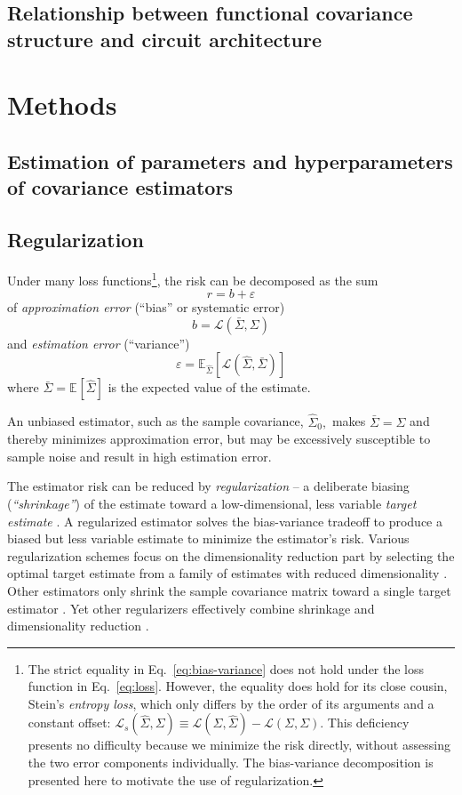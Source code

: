 \documentclass[10pt]{article}
\newcommand{\loss}[1]{\mathcal L\left(#1\right)}
\newcommand{\E}[2][]{\mathbb E_{#1}\left[ #2\right]}    %
\begin{document}
\subsection*{Relationship between functional covariance structure and circuit architecture}

\section*{Methods}
\subsection*{Estimation of parameters and hyperparameters of covariance estimators}
 
\subsection*{Regularization}
Under many loss functions\footnote{
The strict equality in Eq.~\ref{eq:bias-variance} does not hold under the loss function in Eq.~\ref{eq:loss}. 
However, the equality does hold for its close cousin, Stein's \emph{entropy loss}, which only differs by the order of its arguments and a constant offset: $\mathcal L_s(\hat\Sigma,\Sigma) \equiv \loss{\Sigma,\hat\Sigma} - \loss{\Sigma,\Sigma}$. 
This deficiency presents no difficulty because we minimize the risk directly, without assessing the two error components individually. 
The bias-variance decomposition is presented here to motivate the use of regularization.}, 
the risk can be decomposed as the sum
\begin{equation}\label{eq:bias-variance}
    r = b + \varepsilon
\end{equation}
of \emph{approximation error} (``bias'' or systematic error)
\begin{equation}
   b = \loss{\bar\Sigma,\Sigma}
\end{equation}
and \emph{estimation error} (``variance'') 
\begin{equation}
   \varepsilon = \E[\hat\Sigma]{\loss{\hat\Sigma, \bar\Sigma}}
\end{equation}
where $\bar\Sigma = \E{\hat\Sigma}$ is the expected value of the estimate. 

An unbiased estimator, such as the sample covariance,  $\hat\Sigma_0,$ makes $\bar\Sigma=\Sigma$ and thereby minimizes approximation error, but may be excessively susceptible to sample noise and result in high estimation error.

The estimator risk can be reduced by \emph{regularization} -- a deliberate biasing (\emph{``shrinkage''}) of the estimate toward a low-dimensional, less variable \emph{target estimate} \cite{Bickel:2006,Ledoit:2004}. 
A regularized estimator solves the bias-variance tradeoff to produce a biased but less variable estimate to minimize the estimator's risk.  
Various regularization schemes focus on the dimensionality reduction part  by selecting the optimal target estimate from a family of estimates with reduced dimensionality \cite{findit}.  
Other estimators only shrink the sample covariance matrix toward a single target estimator \cite{Schafer:2005}. 
Yet other regularizers effectively combine shrinkage and dimensionality reduction \cite{findit}.
\end{document}
